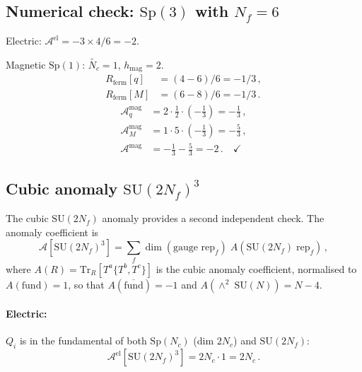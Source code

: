 \documentclass[11pt,a4paper]{article}
\theoremstyle{plain}
\theoremstyle{definition}
\theoremstyle{remark}
\newcommand{\Nc}{N_{\!c}}
\newcommand{\Nf}{N_{\!f}}
\newcommand{\SU}[1]{\mathrm{SU}(#1)}
\newcommand{\Sp}[1]{\mathrm{Sp}(#1)}
\newcommand{\antisym}{\wedge^{\!2}}
\newcommand{\Tr}{\mathrm{Tr}}
\begin{document}
\subsection{Numerical check: $\Sp{3}$ with $\Nf = 6$}

Electric: $\mathcal{A}^{\mathrm{el}} = -3 \times 4 / 6 = -2$.

Magnetic $\Sp{1}$: $\widetilde{\Nc} = 1$, $h_{\mathrm{mag}} = 2$.
\begin{align*}
  R_{\mathrm{ferm}}[q] &= (4 - 6)/6 = -1/3\,, \\
  R_{\mathrm{ferm}}[M] &= (6 - 8)/6 = -1/3\,.
\end{align*}
\begin{align*}
  \mathcal{A}^{\mathrm{mag}}_q
  &= 2 \cdot \frac{1}{2} \cdot \left(-\frac{1}{3}\right)
  = -\frac{1}{3}\,, \\
  \mathcal{A}^{\mathrm{mag}}_M
  &= 1 \cdot 5 \cdot \left(-\frac{1}{3}\right)
  = -\frac{5}{3}\,, \\
  \mathcal{A}^{\mathrm{mag}}
  &= -\frac{1}{3} - \frac{5}{3} = -2\,.
  \quad\checkmark
\end{align*}

\subsection{Cubic anomaly $\SU{2\Nf}^3$}

The cubic $\SU{2\Nf}$ anomaly provides a second independent check.
The anomaly coefficient is
\begin{equation}\label{eq:cubic-anomaly}
  \mathcal{A}[\SU{2\Nf}^3]
  = \sum_f \dim(\text{gauge rep}_f)\; A(\text{SU}(2\Nf)\;\text{rep}_f)\,,
\end{equation}
where $A(R) = \Tr_R[T^a\{T^b, T^c\}]$ is the cubic anomaly
coefficient, normalised to $A(\mathrm{fund}) = 1$, so that
$A(\overline{\mathrm{fund}}) = -1$ and $A(\antisym\;\SU{N}) = N - 4$.

\paragraph{Electric:}
$Q_i$ is in the fundamental of both $\Sp{\Nc}$ (dim $2\Nc$) and
$\SU{2\Nf}$:
\begin{equation}\label{eq:cubic-el}
  \mathcal{A}^{\mathrm{el}}[\SU{2\Nf}^3] = 2\Nc \cdot 1 = 2\Nc\,.
\end{equation}
\end{document}
